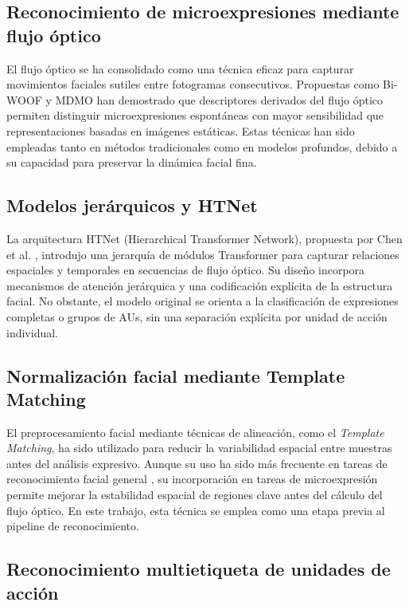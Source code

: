 \documentclass[conference]{IEEEtran}
\begin{document}
\subsection{Reconocimiento de microexpresiones mediante flujo óptico}

El flujo óptico se ha consolidado como una técnica eficaz para capturar movimientos faciales sutiles entre fotogramas consecutivos. Propuestas como Bi-WOOF \cite{liong2018less} y MDMO \cite{liu2016main} han demostrado que descriptores derivados del flujo óptico permiten distinguir microexpresiones espontáneas con mayor sensibilidad que representaciones basadas en imágenes estáticas. Estas técnicas han sido empleadas tanto en métodos tradicionales como en modelos profundos, debido a su capacidad para preservar la dinámica facial fina.

\subsection{Modelos jerárquicos y HTNet}

La arquitectura HTNet (Hierarchical Transformer Network), propuesta por Chen et al. \cite{chen2023htnet}, introdujo una jerarquía de módulos Transformer para capturar relaciones espaciales y temporales en secuencias de flujo óptico. Su diseño incorpora mecanismos de atención jerárquica y una codificación explícita de la estructura facial. No obstante, el modelo original se orienta a la clasificación de expresiones completas o grupos de AUs, sin una separación explícita por unidad de acción individual.

\subsection{Normalización facial mediante Template Matching}

El preprocesamiento facial mediante técnicas de alineación, como el \textit{Template Matching}, ha sido utilizado para reducir la variabilidad espacial entre muestras antes del análisis expresivo. Aunque su uso ha sido más frecuente en tareas de reconocimiento facial general \cite{pan2011template, liu2015facealignment}, su incorporación en tareas de microexpresión permite mejorar la estabilidad espacial de regiones clave antes del cálculo del flujo óptico. En este trabajo, esta técnica se emplea como una etapa previa al pipeline de reconocimiento.

\subsection{Reconocimiento multietiqueta de unidades de acción}
\end{document}
